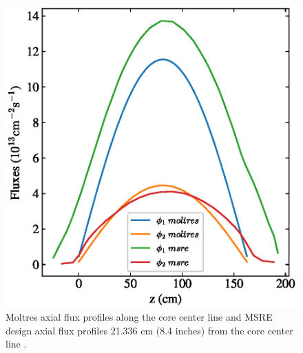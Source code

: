 \documentclass{article}
\makeatletter
\def\maxwidth#1{\ifdim\Gin@nat@width>#1 #1\else\Gin@nat@width\fi}
\makeatother
\begin{document}
\begin{figure}[htpb]
    \centering
    \includegraphics[width=\maxwidth{\textwidth}]{combined_msre_moltres_axial.eps}
    \caption{Moltres axial flux profiles along the core center line and \gls{MSRE}
    design axial flux profiles 21.336 cm (8.4 inches) from the core center line \cite[p. 91]{briggs_molten-salt_1964}.}
    \label{fig:axial_fluxes_compare}
\end{figure}
\end{document}
